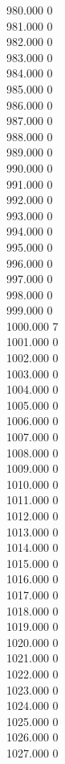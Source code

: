 { 980.000	0 \\
 981.000	0 \\
 982.000	0 \\
 983.000	0 \\
 984.000	0 \\
 985.000	0 \\
 986.000	0 \\
 987.000	0 \\
 988.000	0 \\
 989.000	0 \\
 990.000	0 \\
 991.000	0 \\
 992.000	0 \\
 993.000	0 \\
 994.000	0 \\
 995.000	0 \\
 996.000	0 \\
 997.000	0 \\
 998.000	0 \\
 999.000	0 \\
 1000.000	7 \\
 1001.000	0 \\
 1002.000	0 \\
 1003.000	0 \\
 1004.000	0 \\
 1005.000	0 \\
 1006.000	0 \\
 1007.000	0 \\
 1008.000	0 \\
 1009.000	0 \\
 1010.000	0 \\
 1011.000	0 \\
 1012.000	0 \\
 1013.000	0 \\
 1014.000	0 \\
 1015.000	0 \\
 1016.000	0 \\
 1017.000	0 \\
 1018.000	0 \\
 1019.000	0 \\
 1020.000	0 \\
 1021.000	0 \\
 1022.000	0 \\
 1023.000	0 \\
 1024.000	0 \\
 1025.000	0 \\
 1026.000	0 \\
 1027.000	0 \\
}
